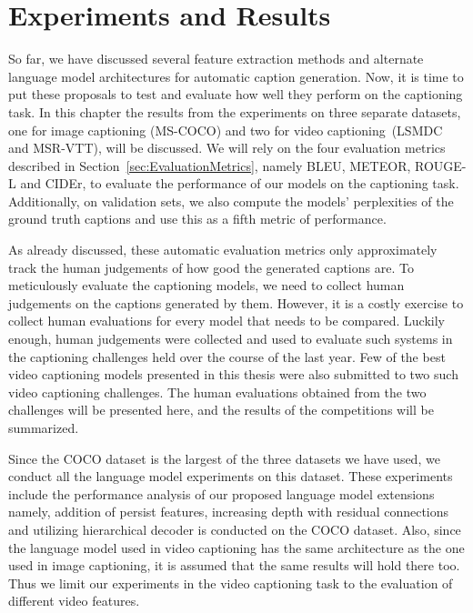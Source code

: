 \chapter{Experiments and Results}
\label{chapter:results}

So far, we have discussed several feature extraction methods and alternate
language model architectures for automatic caption generation.
Now, it is time to put these proposals to test and evaluate how well they
perform on the captioning task.
In this chapter the results from the experiments on three separate datasets, one
for image captioning (MS-COCO) and two for video captioning~(LSMDC and MSR-VTT),
will be discussed.
We will rely on the four evaluation metrics described in
Section~\ref{sec:EvaluationMetrics}, namely BLEU, METEOR, ROUGE-L and CIDEr, to
evaluate the performance of our models on the captioning task.
Additionally, on validation sets, we also compute the models' perplexities of
the ground truth captions and use this as a fifth metric of performance. 

As already discussed, these automatic evaluation metrics only approximately
track the human judgements of how good the generated captions are.
To meticulously evaluate the captioning models, we need to collect human
judgements on the captions generated by them.
However, it is a costly exercise to collect human evaluations for every model
that needs to be compared.
Luckily enough, human judgements were collected and used to evaluate such
systems in the captioning challenges held over the course of the last year.
Few of the best video captioning models presented in this thesis were also
submitted to two such video captioning challenges.
The human evaluations obtained from the two challenges will be presented here,
and the results of the competitions will be summarized. 

Since the COCO dataset is the largest of the three datasets we have used, we
conduct all the language model experiments on this dataset.
These experiments include the performance analysis of our proposed language
model extensions namely, addition of persist features, increasing depth with
residual connections and utilizing hierarchical decoder is conducted on the COCO
dataset.
Also, since the language model used in video captioning has the same
architecture as the one used in image captioning, it is assumed that the same
results will hold there too.
Thus we limit our experiments in the video captioning task to the evaluation of
different video features.

